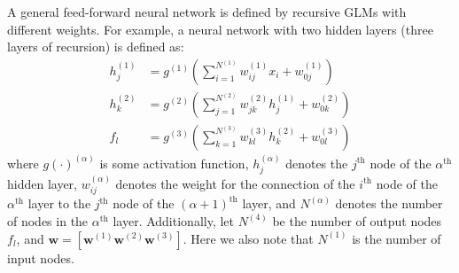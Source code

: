 A general feed-forward neural network is defined by recursive GLMs
with different weights.
For example, a neural network with two hidden layers
(three layers of recursion) is defined as:
%
\begin{equation*}
\begin{aligned}
	h^{(1)}_j &= g^{(1)}
		\left(\sum_{i=1}^{N^{(1)}} w_{ij}^{(1)} x_i + 
      w^{(1)}_{0j} \right) \\
	h^{(2)}_k &= g^{(2)}
		\left(\sum_{j=1}^{N^{(2)}} w_{jk}^{(2)} h_j^{(1)} + 
      w^{(2)}_{0k} \right) \\
	f_l &= g^{(3)}
		\left(\sum_{k=1}^{N^{(3)}} w_{kl}^{(3)} h_k^{(2)} + 
      w^{(3)}_{0l} \right)
\end{aligned}
\end{equation*}
%
where $g(\cdot)^{(\alpha)}$ is some activation function,
$h^{(\alpha)}_j$ denotes the $j^\text{th}$ node of the $\alpha^\text{th}$ 
hidden layer,
$w_{ij}^{(\alpha)}$ denotes the weight for the connection of 
the $i^\text{th}$ node of the $\alpha^\text{th}$ layer to 
the $j^\text{th}$ node of the $(\alpha+1)^\text{th}$ layer,
and $N^{(\alpha)}$ denotes the number of nodes in the $\alpha^\text{th}$ layer.
Additionally, let $N^{(4)}$ be the number of 
output nodes $f_l$,
and $\mathbf{w} = \left[\mathbf{w}^{(1)} \mathbf{w}^{(2)} \mathbf{w}^{(3)} \right]$.
Here we also note that $N^{(1)}$ is the number of input nodes.

